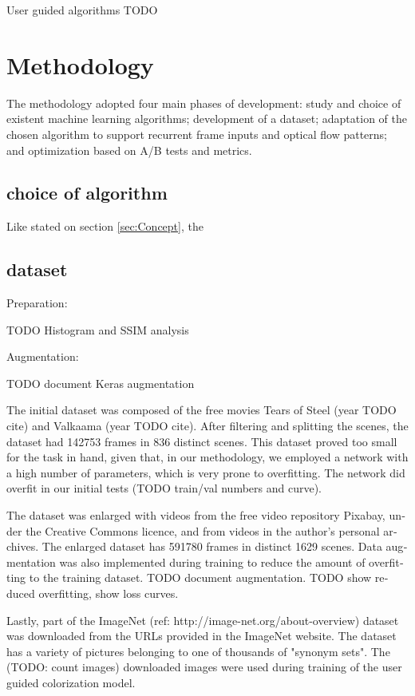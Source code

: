 \documentclass[12pt,openright,twoside,a4paper,english]{abntex2}
\begin{document}
\begin{otherlanguage}{english}
User guided algorithms TODO

\section{Methodology}
The methodology adopted four main phases of development: study and choice of existent machine learning algorithms; development of a dataset; adaptation of the chosen algorithm to support recurrent frame inputs and optical flow patterns; and optimization based on A/B tests and metrics.

\subsection{choice of algorithm}
Like stated on section \ref{sec:Concept}, the

\subsection{dataset}
Preparation:

TODO Histogram and SSIM analysis

Augmentation:

TODO document Keras augmentation

The initial dataset was composed of the free movies Tears of Steel (year TODO cite) and Valkaama (year TODO cite). After filtering and splitting the scenes, the dataset had 142753 frames in 836 distinct scenes. This dataset proved too small for the task in hand, given that, in our methodology, we employed a network with a high number of parameters, which is very prone to overfitting. The network did overfit in our initial tests (TODO train/val numbers and curve).

The dataset was enlarged with videos from the free video repository Pixabay, under the Creative Commons licence, and from videos in the author's personal archives. The enlarged dataset has 591780 frames in distinct 1629 scenes. Data augmentation was also implemented during training to reduce the amount of overfitting to the training dataset. TODO document augmentation. TODO show reduced overfitting, show loss curves.

Lastly, part of the ImageNet (ref: http://image-net.org/about-overview) dataset was downloaded from the URLs provided in the ImageNet website. The dataset has a variety of pictures belonging to one of thousands of "synonym sets". The (TODO: count images) downloaded images were used during training of the user guided colorization model.


\end{otherlanguage}
\end{document}

